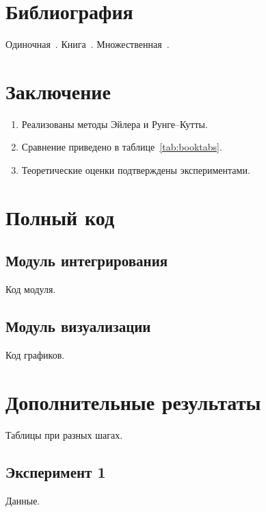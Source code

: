 \documentclass[font=modern]{cmcmsuthesis-cw}
\begin{document}
\section{Библиография}

Одиночная~\cite{shannon1948}. Книга~\cite{knuth1984}.
Множественная~\cite{shannon1948,knuth1984,macwilliams1979}.

\section*{Заключение}

\begin{enumerate}
\item Реализованы методы Эйлера и Рунге--Кутты.
\item Сравнение приведено в таблице~\ref{tab:booktabs}.
\item Теоретические оценки подтверждены экспериментами.
\end{enumerate}

\clearpage\listoftables{}
\printbibliography

\appendix
\section{Полный код}
\subsection{Модуль интегрирования}
Код модуля.
\subsection{Модуль визуализации}
Код графиков.

\section{Дополнительные результаты}
Таблицы при разных шагах.
\subsection{Эксперимент 1}
Данные.
\end{document}
